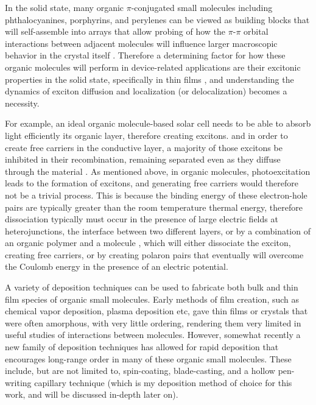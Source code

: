 In the solid state, many organic $\pi$-conjugated small molecules including phthalocyanines, porphyrins, and perylenes can be viewed as building blocks that will self-assemble into arrays that allow probing of how the $\pi$-$\pi$ orbital interactions between adjacent molecules will influence larger macroscopic behavior in the crystal itself\cite{vanNostrum1996} \cite{Armstrong2000} \cite{Simpson2004}  \cite{Elemans2006} \cite{Knupfer2004} \cite{Hoeben2005} \cite{Bartolome2015}.  Therefore a determining factor for how these organic molecules will perform in device-related applications are their excitonic properties in the solid state, specifically in thin films \cite{Forrest1997} \cite{Menke2014} \cite{Ahn2008} \cite{Spano2006}, and understanding the dynamics of exciton diffusion and localization (or delocalization) becomes a necessity.



For example, an ideal organic molecule-based solar cell needs to be able to absorb light efficiently its organic layer, therefore creating excitons. and in order to create free carriers in the conductive layer, a majority of those excitons be inhibited in their recombination, remaining separated even as they diffuse through the material \cite{Lemaur2005}.  As mentioned above, in organic molecules, photoexcitation leads to the formation of excitons, and generating free carriers would therefore not be a trivial process.  This is because the binding energy of these electron-hole pairs are typically greater than the room temperature thermal energy, therefore dissociation typically must occur in the presence of large electric fields at heterojunctions, the interface between two different layers, or by a combination of an organic polymer and a molecule \cite{Peumans2003} \cite{Lemaur2005} \cite{Terao2007}, which will either dissociate the exciton, creating free carriers, or by creating polaron pairs that eventually will overcome the Coulomb energy in the presence of an electric potential.         



A variety of deposition techniques can be used to fabricate both bulk and thin film species of organic small molecules.  Early methods of film creation, such as chemical vapor deposition, plasma deposition etc, gave thin films or crystals that were often amorphous, with very little ordering, rendering them very limited in useful studies of interactions between molecules.  However, somewhat recently a new family of deposition techniques has allowed for rapid deposition that encourages long-range order in many of these organic small molecules.  These include, but are not limited to, spin-coating, blade-casting\cite{Sherman2015}, and a hollow pen-writing capillary technique\cite{Headrick2008} \cite{Cour2012} \cite{Cour2013} (which is my deposition method of choice for this work, and will be discussed in-depth later on). 



